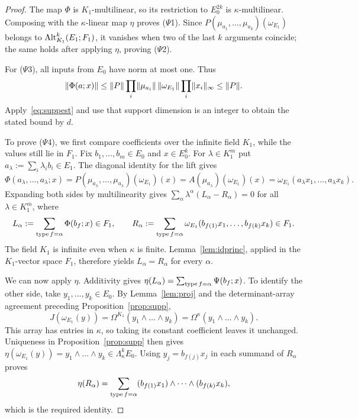 \begin{proof}
The map $\Phi$ is $K_1$\nobreakdash-multilinear, so its restriction to $E_0^{2k}$ is $\kappa$\nobreakdash-multilinear.
Composing with the $\kappa$\nobreakdash-linear map $\eta$ proves ($\Psi$1). Since
$P(\mu_{a_1},\dots,\mu_{a_k})(\omega_{E_1})$ belongs to $\operatorname{Alt}^k_{K_1}(E_1;F_1)$, it vanishes when two of the last $k$ arguments
coincide; the same holds after applying $\eta$, proving ($\Psi$2).

For ($\Psi$3), all inputs from $E_0$ have norm at most one. Thus
\[
\lVert \Phi(a;x)\rVert\le\lVert P\rVert\prod_i\lVert \mu_{a_i}\rVert\,\lVert \omega_{E_1}\rVert\prod_i\lVert x_i\rVert_\infty\le\lVert P\rVert.
\]
Apply~\eqref{eq:suppest} and use that support dimension is an integer to obtain the stated bound by $d$.

To prove ($\Psi$4), we first compare coefficients over the infinite field $K_1$, while the values still lie in
$F_1$. Fix $b_1,\dots,b_m\in E_0$ and $x\in E_0^k$. For $\lambda\in K_1^m$ put
$a_\lambda:=\sum_i\lambda_ib_i\in E_1$. The diagonal identity for the lift gives
\[
\Phi(a_\lambda,\dots,a_\lambda;x)
=P(\mu_{a_\lambda},\dots,\mu_{a_\lambda})(\omega_{E_1})(x)
=A(\mu_{a_\lambda})(\omega_{E_1})(x)
=\omega_{E_1}(a_\lambda x_1,\dots,a_\lambda x_k).
\]
Expanding both sides by multilinearity gives
$\sum_\alpha\lambda^\alpha(L_\alpha-R_\alpha)=0$ for all $\lambda\in K_1^m$, where
\[
L_\alpha:=\sum_{\operatorname{type} f=\alpha}\Phi(b_f;x)\in F_1,\qquad
R_\alpha:=\sum_{\operatorname{type} f=\alpha}\omega_{E_1}(b_{f(1)}x_1,\dots,b_{f(k)}x_k)\in F_1.
\]
The field $K_1$ is infinite even when $\kappa$ is finite. Lemma~\ref{lem:idprinc}, applied in the
$K_1$\nobreakdash-vector space $F_1$, therefore yields $L_\alpha=R_\alpha$ for every $\alpha$.

We can now apply $\eta$. Additivity gives
$\eta(L_\alpha)=\sum_{\operatorname{type} f=\alpha}\Psi(b_f;x)$. To identify the other side, take $y_1,\dots,y_k\in E_0$.
By Lemma~\ref{lem:proj} and the determinant-array agreement preceding Proposition~\ref{prop:supp},
\[
J(\omega_{E_1}(y))=\Omega^{K_1}(y_1\wedge\dots\wedge y_k)
=\Omega^\kappa(y_1\wedge\dots\wedge y_k).
\]
This array has entries in $\kappa$, so taking its constant coefficient leaves it unchanged. Uniqueness in
Proposition~\ref{prop:supp} then gives
$\eta(\omega_{E_1}(y))=y_1\wedge\dots\wedge y_k\in\Lambda^k_\kappa E_0$.
Using $y_j=b_{f(j)}x_j$ in each summand of $R_\alpha$ proves
\[
\eta(R_\alpha)=\sum_{\operatorname{type} f=\alpha}(b_{f(1)}x_1)\wedge\dots\wedge(b_{f(k)}x_k),
\]
which is the required identity.
\end{proof}

